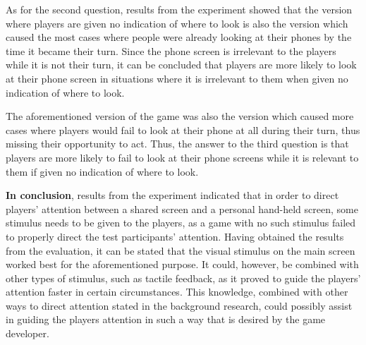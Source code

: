 As for the second question, results from the experiment showed that the version where players are given no indication of where to look is also the version which caused the most cases where people were already looking at their phones by the time it became their turn. Since the phone screen is irrelevant to the players while it is not their turn, it can be concluded that players are more likely to look at their phone screen in situations where it is irrelevant to them when given no indication of where to look.

The aforementioned version of the game was also the version which caused more cases where players would fail to look at their phone at all during their turn, thus missing their opportunity to act. Thus, the answer to the third question is that players are more likely to fail to look at their phone screens while it is relevant to them if given no indication of where to look.

\textbf{In conclusion}, results from the experiment indicated that in order to direct players’ attention between a shared screen and a personal hand-held screen, some stimulus needs to be given to the players, as a game with no such stimulus failed to properly direct the test participants’ attention. Having obtained the results from the evaluation, it can be stated that the visual stimulus on the main screen worked best for the aforementioned purpose. It could, however, be combined with other types of stimulus, such as tactile feedback, as it proved to guide the players’ attention faster in certain circumstances. This knowledge, combined with other ways to direct attention stated in the background research, could possibly assist in guiding the players attention in such a way that is desired by the game developer.